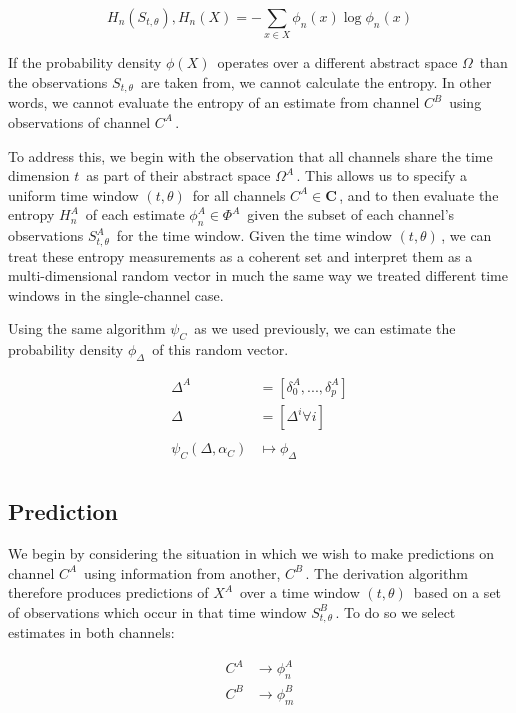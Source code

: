 \documentclass[11pt,titlepage]{article}
\begin{document}
\[ 
H_n(S_{t,\theta}), H_n(X) = -\sum_{x \in X} \phi_n(x) \log \phi_n(x)
\]

If the probability density \(\phi(X) \,\!\) operates over a different abstract space \(\Omega \,\!\) than the observations \(S_{t,\theta} \,\!\) are taken from, we cannot calculate the entropy.  In other words, we cannot evaluate the entropy of an estimate from channel \(C^B \,\!\) using observations of channel \(C^A \,\!\).  

To address this, we begin with the observation that all channels share the time dimension \(t \,\!\) as part of their abstract space \(\Omega^A \,\!\).  This allows us to specify a uniform time window \((t,\theta) \,\!\) for all channels \(C^A \in \mathbf{C} \,\!\), and to then evaluate the entropy \(H_n^A \,\!\) of each estimate \(\phi_n^A \in \Phi^A \,\!\) given the subset of each channel's observations \(S_{t,\theta}^A \,\!\) for the time window.  Given the time window \((t,\theta) \,\!\), we can treat these entropy measurements as a coherent set and interpret them as a multi-dimensional random vector in much the same way we treated different time windows in the single-channel case.

Using the same algorithm \(\psi_C \,\!\) as we used previously, we can estimate the probability density \(\phi_\Delta \,\!\) of this random vector. 

\[ 
\begin{align}
\Delta^A &= [\delta_0^A,...,\delta_p^A] \\
\Delta &= [\Delta^i \forall i] \\
\\
\psi_C( \Delta , \alpha_C ) &\mapsto \phi_\Delta \\
\end{align}
\]

\subsection{Prediction}
We begin by considering the situation in which we wish to make predictions on channel \(C^A \,\!\) using information from another, \(C^B \,\!\).  The derivation algorithm therefore produces predictions of \(X^A \,\!\) over a time window \((t,\theta) \,\!\) based on a set of observations which occur in that time window \(S_{t,\theta}^B \,\!\).  To do so we select estimates in both channels:

\[ 
\begin{align}
C^A &\rightarrow \phi_n^A \\
C^B &\rightarrow \phi_m^B \\
\end{align}
\]
\end{document}
